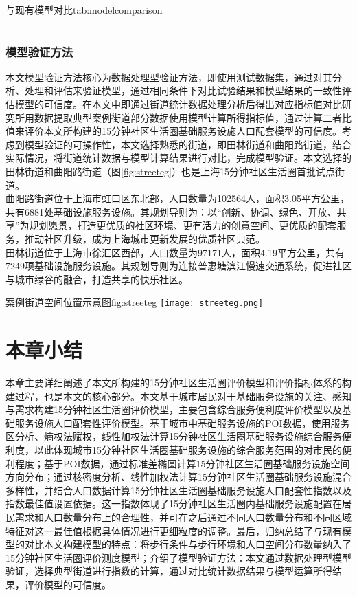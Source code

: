 \documentclass{shnuthesis}
\begin{document}
\begin{generaltab}[htb]{与现有模型对比}{tab:modelcomparison}
\begin{tabularx}{1\textwidth}{cl}
		\bottomrule[1.5pt]
	\end{tabularx}
\vspace{1em}
\end{generaltab}


\subsubsection{模型验证方法}

本文模型验证方法核心为数据处理型验证方法，即使用测试数据集，通过对其分析、处理和评估来验证模型，通过相同条件下对比试验结果和模型结果的一致性评估模型的可信度。在本文中即通过街道统计数据处理分析后得出对应指标值对比研究所用数据提取典型案例街道部分数据使用模型计算所得指标值，通过计算二者比值来评价本文所构建的15分钟社区生活圈基础服务设施人口配套模型的可信度。考虑到模型验证的可操作性，本文选择熟悉的街道，即田林街道和曲阳路街道，结合实际情况，将街道统计数据与模型计算结果进行对比，完成模型验证。本文选择的田林街道和曲阳路街道（图\ref{fig:streeteg}）也是上海15分钟社区生活圈首批试点街道。\\
\indent 曲阳路街道位于上海市虹口区东北部，人口数量为102564人，面积3.05平方公里，共有6881处基础设施服务设施。其规划导则为：以“创新、协调、绿色、开放、共享”为规划愿景，打造更优质的社区环境、更有活力的创意空间、更优质的配套服务，推动社区升级，成为上海城市更新发展的优质社区典范。\\
\indent 田林街道位于上海市徐汇区西部，人口数量为97171人，面积4.19平方公里，共有7249项基础设施服务设施。其规划导则为连接普惠塘滨江慢速交通系统，促进社区与城市绿谷的融合，打造共享的快乐社区。


\begin{generalfig}[htp]{案例街道空间位置示意图}{fig:streeteg}
	\texttt{[image: streeteg.png]}
\end{generalfig}

\section{本章小结}

本章主要详细阐述了本文所构建的15分钟社区生活圈评价模型和评价指标体系的构建过程，也是本文的核心部分。本文基于城市居民对于基础服务设施的关注、感知与需求构建15分钟社区生活圈评价模型，主要包含综合服务便利度评价模型以及基础服务设施人口配套性评价模型。基于城市中基础服务设施的POI数据，使用服务区分析、熵权法赋权，线性加权法计算15分钟社区生活圈基础服务设施综合服务便利度，以此体现城市15分钟社区生活圈基础服务设施的综合服务范围的对市民的便利程度；基于POI数据，通过标准差椭圆计算15分钟社区生活圈基础服务设施空间方向分布；通过核密度分析、线性加权法计算15分钟社区生活圈基础服务设施混合多样性，并结合人口数据计算15分钟社区生活圈基础服务设施人口配套性指数以及指数最佳值设置依据。这一指数体现了15分钟社区生活圈内基础服务设施配置在居民需求和人口数量分布上的合理性，并可在之后通过不同人口数量分布和不同区域特征对这一最佳值根据具体情况进行更细粒度的调整。最后，归纳总结了与现有模型的对比本文构建模型的特点：将步行条件与步行环境和人口空间分布数量纳入了15分钟社区生活圈评价测度模型；介绍了模型验证方法：本文通过数据处理型模型验证，选择典型街道进行指数的计算，通过对比统计数据结果与模型运算所得结果，评价模型的可信度。
\end{document}
